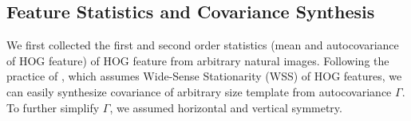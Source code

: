 \documentclass[10pt,twocolumn,letterpaper]{article}
\begin{document}
\subsection{Feature Statistics and Covariance Synthesis}
\label{sec:feature_statistics}
We first collected the first and second order statistics (mean and autocovariance of HOG feature) of HOG feature from arbitrary natural images. Following the practice of \cite{Hariharan12}, which assumes Wide-Sense Stationarity (WSS) of HOG features, we can easily synthesize covariance of arbitrary size template from autocovariance $\Gamma$. To further simplify $\Gamma$, we assumed horizontal and vertical symmetry.




% 
\end{document}

